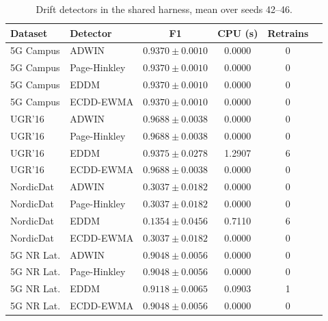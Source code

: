 \begin{table}[t]
\caption{Drift detectors in the shared harness, mean over seeds 42--46.}
\label{tab:detectors}
\centering
\scriptsize
\begin{tabular}{@{}llcccc@{}}
\toprule
\textbf{Dataset} & \textbf{Detector} & \textbf{F1} & \textbf{CPU (s)} & \textbf{Retrains} \\
\midrule
5G Campus & ADWIN & $0.9370 \pm 0.0010$ & 0.0000 & 0 \\
5G Campus & Page-Hinkley & $0.9370 \pm 0.0010$ & 0.0000 & 0 \\
5G Campus & EDDM & $0.9370 \pm 0.0010$ & 0.0000 & 0 \\
5G Campus & ECDD-EWMA & $0.9370 \pm 0.0010$ & 0.0000 & 0 \\
UGR'16 & ADWIN & $0.9688 \pm 0.0038$ & 0.0000 & 0 \\
UGR'16 & Page-Hinkley & $0.9688 \pm 0.0038$ & 0.0000 & 0 \\
UGR'16 & EDDM & $0.9375 \pm 0.0278$ & 1.2907 & 6 \\
UGR'16 & ECDD-EWMA & $0.9688 \pm 0.0038$ & 0.0000 & 0 \\
NordicDat & ADWIN & $0.3037 \pm 0.0182$ & 0.0000 & 0 \\
NordicDat & Page-Hinkley & $0.3037 \pm 0.0182$ & 0.0000 & 0 \\
NordicDat & EDDM & $0.1354 \pm 0.0456$ & 0.7110 & 6 \\
NordicDat & ECDD-EWMA & $0.3037 \pm 0.0182$ & 0.0000 & 0 \\
5G NR Lat. & ADWIN & $0.9048 \pm 0.0056$ & 0.0000 & 0 \\
5G NR Lat. & Page-Hinkley & $0.9048 \pm 0.0056$ & 0.0000 & 0 \\
5G NR Lat. & EDDM & $0.9118 \pm 0.0065$ & 0.0903 & 1 \\
5G NR Lat. & ECDD-EWMA & $0.9048 \pm 0.0056$ & 0.0000 & 0 \\
\bottomrule
\end{tabular}
\end{table}
